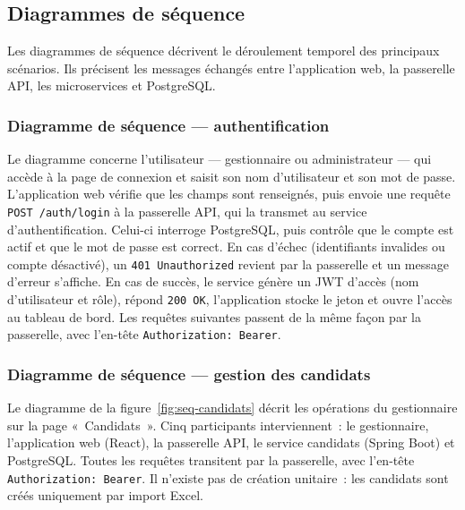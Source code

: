 \begin{onehalfspace}
\subsection{Diagrammes de séquence}

Les diagrammes de séquence décrivent le déroulement temporel des principaux scénarios. Ils précisent les messages échangés entre l'application web, la passerelle API, les microservices et PostgreSQL.

\subsubsection{Diagramme de séquence --- authentification}


Le diagramme concerne l'utilisateur --- gestionnaire ou administrateur --- qui accède à la page de connexion et saisit son nom d'utilisateur et son mot de passe. L'application web vérifie que les champs sont renseignés, puis envoie une requête \texttt{POST /auth/login} à la passerelle API, qui la transmet au service d'authentification. Celui-ci interroge PostgreSQL, puis contrôle que le compte est actif et que le mot de passe est correct. En cas d'échec (identifiants invalides ou compte désactivé), un \texttt{401 Unauthorized} revient par la passerelle et un message d'erreur s'affiche. En cas de succès, le service génère un JWT d'accès (nom d'utilisateur et rôle), répond \texttt{200 OK}, l'application stocke le jeton et ouvre l'accès au tableau de bord. Les requêtes suivantes passent de la même façon par la passerelle, avec l'en-tête \texttt{Authorization: Bearer}.

\subsubsection{Diagramme de séquence --- gestion des candidats}

Le diagramme de la figure~\ref{fig:seq-candidats} décrit les opérations du gestionnaire sur la page «~Candidats~». Cinq participants interviennent~: le gestionnaire, l'application web (React), la passerelle API, le service candidats (Spring Boot) et PostgreSQL. Toutes les requêtes transitent par la passerelle, avec l'en-tête \texttt{Authorization: Bearer}. Il n'existe pas de création unitaire~: les candidats sont créés uniquement par import Excel.



\end{onehalfspace}
